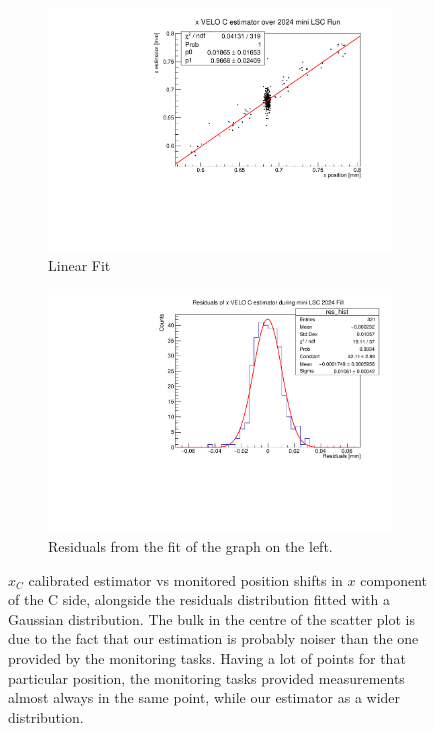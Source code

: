\begin{figure}
    \centering
    \begin{subfigure}{0.48\textwidth}
    \includegraphics[width=\linewidth]{figures/xVeloC_fit_comparison.pdf}
    \caption{Linear Fit}\label{fig:xCfit_comparison}
    \end{subfigure}
    \begin{subfigure}{0.48\textwidth}
    \includegraphics[width=\linewidth]{figures/xVeloC_res_comparison.pdf}
    \caption{Residuals from the fit of the graph on the left. }\label{fig:xCres_comparison}
    \end{subfigure}
    \caption{$\hat{x}_{C}$ calibrated estimator vs monitored position shifts in $x$ component of the C side, alongside the residuals distribution fitted with a Gaussian distribution. The bulk in the centre of the scatter plot is due to the fact that our estimation is probably noiser than the one provided by the monitoring tasks. Having a lot of points for that particular position, the monitoring tasks provided measurements almost always in the same point, while our estimator as a wider distribution.}
    \label{fig:xC_comaprison}
\end{figure}
